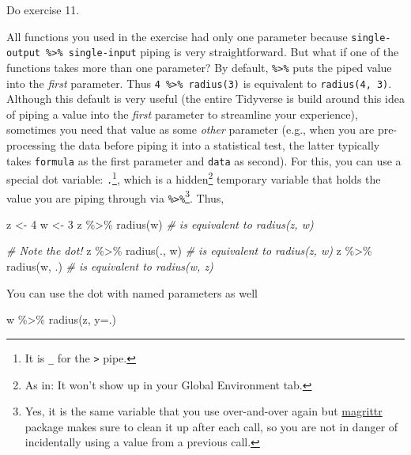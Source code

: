 \documentclass[
]{book}
\newenvironment{Shaded}{\begin{snugshade}}{\end{snugshade}}
\newcommand{\AttributeTok}[1]{\textcolor[rgb]{0.77,0.63,0.00}{#1}}
\newcommand{\CommentTok}[1]{\textcolor[rgb]{0.56,0.35,0.01}{\textit{#1}}}
\newcommand{\DecValTok}[1]{\textcolor[rgb]{0.00,0.00,0.81}{#1}}
\newcommand{\FunctionTok}[1]{\textcolor[rgb]{0.00,0.00,0.00}{#1}}
\newcommand{\NormalTok}[1]{#1}
\newcommand{\OtherTok}[1]{\textcolor[rgb]{0.56,0.35,0.01}{#1}}
\newcommand{\SpecialCharTok}[1]{\textcolor[rgb]{0.00,0.00,0.00}{#1}}
\begin{document}
Do exercise 11.

All functions you used in the exercise had only one parameter because \texttt{single-output\ \%\textgreater{}\%\ single-input} piping is very straightforward. But what if one of the functions takes more than one parameter? By default, \texttt{\%\textgreater{}\%} puts the piped value into the \emph{first} parameter. Thus \texttt{4\ \%\textgreater{}\%\ radius(3)} is equivalent to \texttt{radius(4,\ 3)}. Although this default is very useful (the entire Tidyverse is build around this idea of piping a value into the \emph{first} parameter to streamline your experience), sometimes you need that value as some \emph{other} parameter (e.g., when you are pre-processing the data before piping it into a statistical test, the latter typically takes \texttt{formula} as the first parameter and \texttt{data} as second). For this, you can use a special dot variable: \texttt{.}\footnote{It is \texttt{\_} for the \texttt{\textbar{}\textgreater{}} pipe.}, which is a hidden\footnote{As in: It won't show up in your Global Environment tab.} temporary variable that holds the value you are piping through via \texttt{\%\textgreater{}\%}\footnote{Yes, it is the same variable that you use over-and-over again but \href{https://magrittr.tidyverse.org/articles/magrittr.html}{magrittr} package makes sure to clean it up after each call, so you are not in danger of incidentally using a value from a previous call.}. Thus,

\begin{Shaded}
\begin{Highlighting}[]
\NormalTok{z }\OtherTok{\textless{}{-}} \DecValTok{4}
\NormalTok{w }\OtherTok{\textless{}{-}} \DecValTok{3}
\NormalTok{z }\SpecialCharTok{\%\textgreater{}\%} \FunctionTok{radius}\NormalTok{(w) }\CommentTok{\# is equivalent to radius(z, w)}

\CommentTok{\# Note the dot!}
\NormalTok{z }\SpecialCharTok{\%\textgreater{}\%} \FunctionTok{radius}\NormalTok{(., w) }\CommentTok{\# is equivalent to radius(z, w)}
\NormalTok{z }\SpecialCharTok{\%\textgreater{}\%} \FunctionTok{radius}\NormalTok{(w, .) }\CommentTok{\# is equivalent to radius(w, z)}
\end{Highlighting}
\end{Shaded}

You can use the dot with named parameters as well

\begin{Shaded}
\begin{Highlighting}[]
\NormalTok{w }\SpecialCharTok{\%\textgreater{}\%} \FunctionTok{radius}\NormalTok{(z, }\AttributeTok{y=}\NormalTok{.)}
\end{Highlighting}
\end{Shaded}
\end{document}
